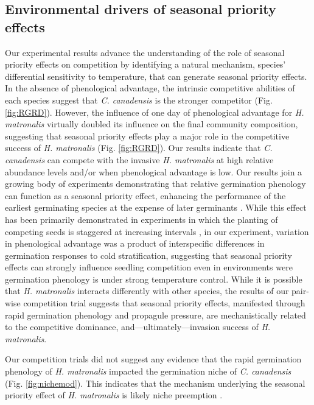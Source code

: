 \documentclass{article}[11pt]
\begin{document}
{\subsection*{Environmental drivers of seasonal priority effects}
Our experimental results advance the understanding of the role of seasonal priority effects on competition by identifying a natural mechanism, species' differential sensitivity to temperature, that can generate seasonal priority effects. In the absence of phenological advantage, the intrinsic competitive abilities of each species suggest that \textit{C. canadensis} is the stronger competitor (Fig. \ref{fig:RGRD}). %
However, the influence of one day of phenological advantage for \textit{H. matronalis} virtually doubled its influence on the final community composition, suggesting that seasonal priority effects play a major role in the competitive success of \textit{H. matronalis} (Fig. \ref{fig:RGRD}). Our results indicate that \textit{C. canadensis} can compete with the invasive \textit{H. matronalis} at high relative abundance levels and/or when phenological advantage is low. Our results join a growing body of experiments demonstrating that relative germination phenology can function as a seasonal priority effect, enhancing the performance of the earliest germinating species at the expense of later germinants \citep{Korner2008,Dickson2012,Ross1972}. While this effect has been primarily demonstrated in experiments in which the planting of competing seeds is staggered at increasing intervals \citep{Young:2017aa,Weidlich:2020aa}, in our experiment, variation in phenological advantage was a product of interspecific differences in germination responses to cold stratification, suggesting that seasonal priority effects can strongly influence seedling competition even in environments were germination phenology is under strong temperature control. While it is possible that \textit{H. matronalis} interacts differently with other species, the results of our pair-wise competition trial suggests that seasonal priority effects, manifested through rapid germination phenology and propagule pressure, are mechanistically related to the competitive dominance, and---ultimately---invasion success of \textit{H. matronalis}. 

Our competition trials did not suggest any evidence that the rapid germination phenology of \textit{H. matronalis} impacted the germination niche of \textit{C. canadensis} (Fig. \ref{fig:nichemod}). This indicates that the mechanism underlying the seasonal priority effect of \textit{H. matronalis} is likely niche preemption \citep{Gioria2018}.%

}
\end{document}
